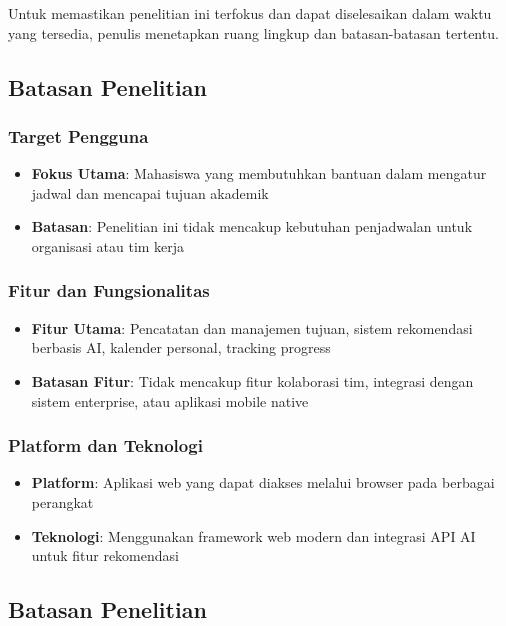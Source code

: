 Untuk memastikan penelitian ini terfokus dan dapat diselesaikan dalam waktu yang tersedia, penulis menetapkan ruang lingkup dan batasan-batasan tertentu.

\subsection{Batasan Penelitian}

\subsubsection{Target Pengguna}
\begin{itemize}
\item \textbf{Fokus Utama}: Mahasiswa yang membutuhkan bantuan dalam mengatur jadwal dan mencapai tujuan akademik
\item \textbf{Batasan}: Penelitian ini tidak mencakup kebutuhan penjadwalan untuk organisasi atau tim kerja
\end{itemize}

\subsubsection{Fitur dan Fungsionalitas}
\begin{itemize}
\item \textbf{Fitur Utama}: Pencatatan dan manajemen tujuan, sistem rekomendasi berbasis AI, kalender personal, tracking progress
\item \textbf{Batasan Fitur}: Tidak mencakup fitur kolaborasi tim, integrasi dengan sistem enterprise, atau aplikasi mobile native
\end{itemize}

\subsubsection{Platform dan Teknologi}
\begin{itemize}
\item \textbf{Platform}: Aplikasi web yang dapat diakses melalui browser pada berbagai perangkat
\item \textbf{Teknologi}: Menggunakan framework web modern dan integrasi API AI untuk fitur rekomendasi
\end{itemize}

\subsection{Batasan Penelitian}

